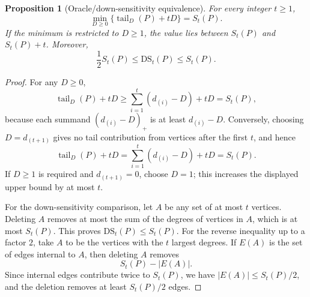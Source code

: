 \documentclass[11pt]{article}
\newtheorem{proposition}[theorem]{Proposition}
\newcommand{\tail}{\operatorname{tail}}
\begin{document}
\begin{proposition}[Oracle/down-sensitivity equivalence]
\label{prop:oracle-down}
For every integer \(t\ge1\),
\[
\min_{D\ge0}\{\tail_D(P)+tD\}=S_t(P).
\]
If the minimum is restricted to \(D\ge1\), the value lies between \(S_t(P)\) and \(S_t(P)+t\). Moreover,
\[
\frac12 S_t(P)\le \mathrm{DS}_t(P)\le S_t(P).
\]
\end{proposition}

\begin{proof}
For any \(D\ge0\),
\[
\tail_D(P)+tD
\ge \sum_{i=1}^t(d_{(i)}-D)+tD
=S_t(P),
\]
because each summand \((d_{(i)}-D)_+\) is at least \(d_{(i)}-D\). Conversely, choosing \(D=d_{(t+1)}\) gives no tail contribution from vertices after the first \(t\), and hence
\[
\tail_D(P)+tD
=\sum_{i=1}^t(d_{(i)}-D)+tD
=S_t(P).
\]
If \(D\ge1\) is required and \(d_{(t+1)}=0\), choose \(D=1\); this increases the displayed upper bound by at most \(t\).

For the down-sensitivity comparison, let \(A\) be any set of at most \(t\) vertices. Deleting \(A\) removes at most the sum of the degrees of vertices in \(A\), which is at most \(S_t(P)\). This proves \(\mathrm{DS}_t(P)\le S_t(P)\). For the reverse inequality up to a factor \(2\), take \(A\) to be the vertices with the \(t\) largest degrees. If \(E(A)\) is the set of edges internal to \(A\), then deleting \(A\) removes
\[
S_t(P)-|E(A)|.
\]
Since internal edges contribute twice to \(S_t(P)\), we have \(|E(A)|\le S_t(P)/2\), and the deletion removes at least \(S_t(P)/2\) edges.
\end{proof}
\end{document}
